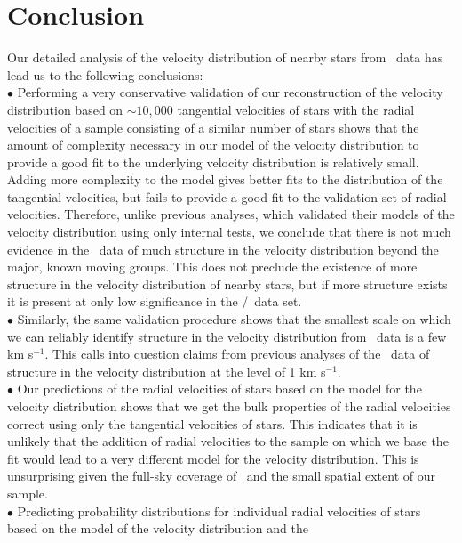 \section{Conclusion}

Our detailed analysis of the velocity distribution of nearby stars
from \Hipparcos\ data has lead us to the following conclusions:\\
$\bullet$ Performing a very conservative validation of our
reconstruction of the velocity distribution based on $\sim\!10,000$
tangential velocities of stars with the radial velocities of a sample
consisting of a similar number of stars shows that the amount of
complexity necessary in our model of the velocity distribution to
provide a good fit to the underlying velocity distribution is
relatively small. Adding more complexity to the model gives better
fits to the distribution of the tangential velocities, but fails to
provide a good fit to the validation set of radial velocities.
Therefore, unlike previous analyses, which validated their models of
the velocity distribution using only internal tests, we conclude that
there is not much evidence in the \Hipparcos\ data of much structure
in the velocity distribution beyond the major, known moving
groups. This does not preclude the existence of more structure in the
velocity distribution of nearby stars, but if more structure exists it
is present at only low significance in the \Hipparcos/\gcsabb\ data
set.\\ $\bullet$ Similarly, the same validation procedure shows that
the smallest scale on which we can reliably identify structure in the
velocity distribution from \Hipparcos\ data is a few km s$^{-1}$. This
calls into question claims from previous analyses of the \Hipparcos\
data of structure in the velocity distribution at the level of 1 km
s$^{-1}$. \\ $\bullet$ Our predictions of the radial velocities of
stars based on the model for the velocity distribution shows that we
get the bulk properties of the radial velocities correct using only
the tangential velocities of stars. This indicates that it is unlikely
that the addition of radial velocities to the sample on which we base
the fit would lead to a very different model for the velocity
distribution. This is unsurprising given the full-sky coverage of
\Hipparcos\ and the small spatial extent of our sample.\\$\bullet$
Predicting probability distributions for individual radial velocities
of stars based on the model of the velocity distribution and the

